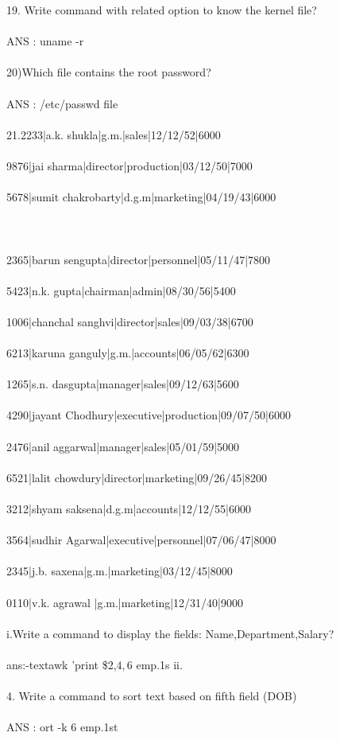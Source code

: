 \documentclass{article}
\begin{document}
19. Write command with related option to know the kernel file? \\ \\
ANS : uname -r \\ \\
20)Which file contains the root password?\\ \\
ANS : /etc/passwd file \\ \\
21.2233|a.k. shukla|g.m.|sales|12/12/52|6000\\ \\
9876|jai sharma|director|production|03/12/50|7000\\ \\
5678|sumit chakrobarty|d.g.m|marketing|04/19/43|6000\\ \\\\ \\
2365|barun sengupta|director|personnel|05/11/47|7800\\ \\
5423|n.k. gupta|chairman|admin|08/30/56|5400\\ \\
1006|chanchal sanghvi|director|sales|09/03/38|6700\\ \\
6213|karuna ganguly|g.m.|accounts|06/05/62|6300\\ \\
1265|s.n. dasgupta|manager|sales|09/12/63|5600\\ \\
4290|jayant Chodhury|executive|production|09/07/50|6000\\ \\
2476|anil aggarwal|manager|sales|05/01/59|5000\\ \\
6521|lalit chowdury|director|marketing|09/26/45|8200\\ \\
3212|shyam saksena|d.g.m|accounts|12/12/55|6000\\ \\
3564|sudhir Agarwal|executive|personnel|07/06/47|8000\\ \\
2345|j.b. saxena|g.m.|marketing|03/12/45|8000\\ \\
0110|v.k. agrawal |g.m.|marketing|12/31/40|9000\\ \\
i.Write a command to display the fields:
Name,Department,Salary? \\ \\
ans:-text{awk '{print \$2,$4,$6} emp.1s}
ii.\\\\


4. Write a command to sort text based on fifth field (DOB)\\ \\
ANS : ort -k 6 emp.1st
\end{document}
